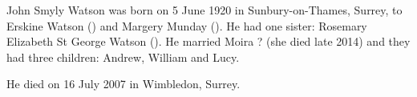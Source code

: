 
John Smyly Watson was born on 5 June 1920 in	Sunbury-on-Thames, Surrey, to Erskine Watson () and
Margery Munday (). He had one sister:  Rosemary Elizabeth St George Watson ().
He married Moira ? (she died late 2014) and they had three children: Andrew, William and Lucy.

He died on 16 July 2007 in Wimbledon, Surrey.
